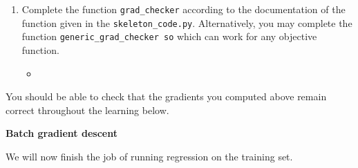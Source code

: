 \documentclass{article}
\newcommand{\nyuparagrah}[1]{\textcolor{nyupurple}{\large #1}}
\begin{document}
\begin{enumerate}
\setcounter{enumi}{\value{saveenum}}
\item Complete the function \texttt{grad\_checker} according to the documentation of the function given in the \texttt{skeleton\_code.py}. Alternatively, you may complete the function \texttt{generic\_grad\_checker
so} which can work for any objective function. 
\begin{itemize}
    \item \inputminted[firstline=82, lastline=140, breaklines=True]{python}{HW_2.PY.py}
\end{itemize}

\setcounter{saveenum}{\value{enumi}}
\end{enumerate}
You should be able to check that the gradients you computed above remain correct throughout the learning below.

\nyuparagrah{\bf Batch gradient descent}

We will now finish the job of
running regression on the training set. 
\end{document}
